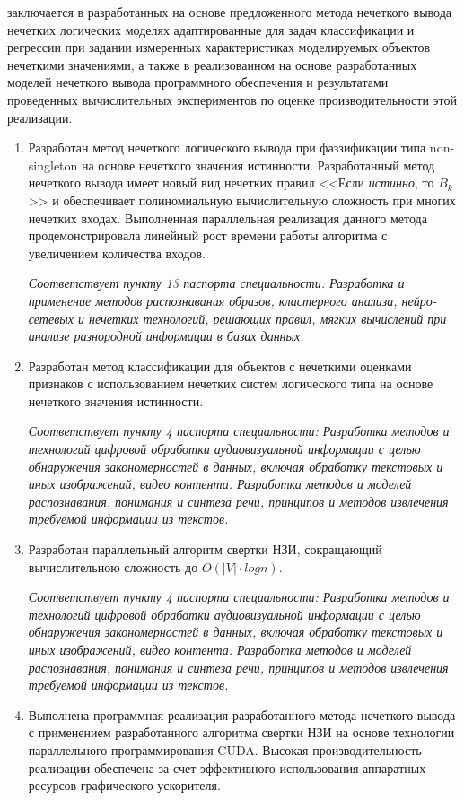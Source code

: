 {\practicalValue} заключается в разработанных на основе предложенного метода нечеткого вывода нечетких логических моделях адаптированные для задач классификации и регрессии при задании измеренных характеристиках моделируемых объектов нечеткими значениями, а также в реализованном на основе разработанных моделей нечеткого вывода программного обеспечения и результатами проведенных вычислительных экспериментов по оценке производительности этой реализации.

{}
\begin{enumerate}[beginpenalty=10000] %
  \item Разработан метод нечеткого логического вывода при фаззификации типа non-singleton на основе нечеткого значения истинности. Разработанный метод нечеткого вывода имеет новый вид нечетких правил <<Если \textit{истинно}, то $B_k$>> и обеспечивает полиномиальную вычислительную сложность при многих нечетких входах. Выполненная параллельная реализация данного метода продемонстрировала линейный рост времени работы алгоритма с увеличением количества входов.
 
  \textit{Соответствует пункту 13 паспорта специальности: Разработка и применение методов распознавания образов, кластерного анализа, нейро-сетевых и нечетких технологий, решающих правил, мягких вычислений при анализе разнородной информации в базах данных.}
  \item Разработан метод классификации для объектов с нечеткими оценками признаков с использованием нечетких систем логического типа на основе нечеткого значения истинности.
  
  \textit{Соответствует пункту 4 паспорта специальности: Разработка методов и технологий цифровой обработки аудиовизуальной информации с целью обнаружения закономерностей в данных, включая обработку текстовых и иных изображений, видео контента. Разработка методов и моделей распознавания, понимания и синтеза речи, принципов и методов извлечения требуемой информации из текстов.}
  \item Разработан параллельный алгоритм свертки НЗИ, сокращающий вычислительною сложность до $O(|V|\cdot log n)$.
  
  \textit{Соответствует пункту 4 паспорта специальности: Разработка методов и технологий цифровой обработки аудиовизуальной информации с целью обнаружения закономерностей в данных, включая обработку текстовых и иных изображений, видео контента. Разработка методов и моделей распознавания, понимания и синтеза речи, принципов и методов извлечения требуемой информации из текстов.}
  \item Выполнена программная реализация разработанного метода нечеткого вывода с применением разработанного алгоритма свертки НЗИ на основе технологии параллельного программирования CUDA. Высокая производительность реализации обеспечена за счет эффективного использования аппаратных ресурсов графического ускорителя.
  

\end{enumerate}
